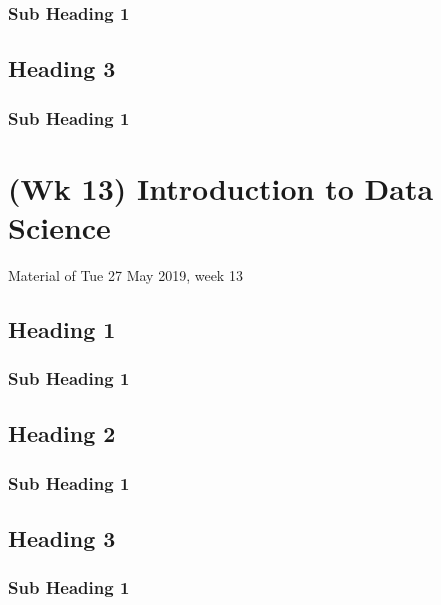 \documentclass[]{book}
\begin{document}
\hypertarget{sub-heading-1-28}{%
\subsection{Sub Heading 1}\label{sub-heading-1-28}}

\hypertarget{heading-3-9}{%
\section{Heading 3}\label{heading-3-9}}

\hypertarget{sub-heading-1-29}{%
\subsection{Sub Heading 1}\label{sub-heading-1-29}}

\hypertarget{wk-13-introduction-to-data-science}{%
\chapter{(Wk 13) Introduction to Data Science}\label{wk-13-introduction-to-data-science}}

Material of Tue 27 May 2019, week 13

\hypertarget{heading-1-10}{%
\section{Heading 1}\label{heading-1-10}}

\hypertarget{sub-heading-1-30}{%
\subsection{Sub Heading 1}\label{sub-heading-1-30}}

\hypertarget{heading-2-10}{%
\section{Heading 2}\label{heading-2-10}}

\hypertarget{sub-heading-1-31}{%
\subsection{Sub Heading 1}\label{sub-heading-1-31}}

\hypertarget{heading-3-10}{%
\section{Heading 3}\label{heading-3-10}}

\hypertarget{sub-heading-1-32}{%
\subsection{Sub Heading 1}\label{sub-heading-1-32}}


\end{document}
